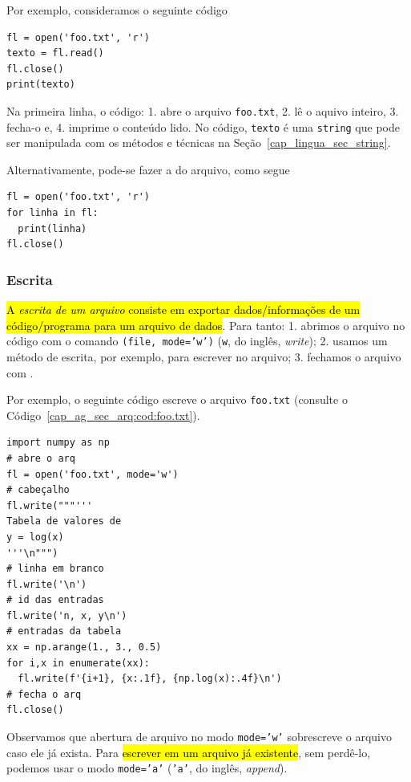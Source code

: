 Por exemplo, consideramos o seguinte código

\begin{lstlisting}
fl = open('foo.txt', 'r')
texto = fl.read()
fl.close()
print(texto)
\end{lstlisting}

Na primeira linha, o código: 1. abre o arquivo \texttt{foo.txt}, 2. lê o aquivo inteiro, 3. fecha-o e, 4. imprime o conteúdo lido. No código, \texttt{texto} é uma \texttt{string} que pode ser manipulada com os métodos e técnicas na Seção~\ref{cap_lingua_sec_string}.

Alternativamente, pode-se fazer a  do arquivo, como segue

\begin{lstlisting}
fl = open('foo.txt', 'r')
for linha in fl:
  print(linha)
fl.close()
\end{lstlisting}

\subsubsection{Escrita}

\hl{A \emph{escrita de um arquivo} consiste em exportar dados/informações de um código/programa para um arquivo de dados}. Para tanto: 1. abrimos o arquivo no código com o comando {\PYTHONopen}\texttt{(file, mode='w')} (\texttt{w}, do inglês, \textit{write}); 2. usamos um método de escrita, por exemplo, {\PYTHONfileDOTwrite} para escrever no arquivo; 3. fechamos o arquivo com {\PYTHONfileDOTclose}.

Por exemplo, o seguinte código escreve o arquivo \texttt{foo.txt} (consulte o Código~\ref{cap_ag_sec_arq:cod:foo.txt}).

\begin{lstlisting}[caption=foo.py, label=cap_ag_sec_arq:cod:foo.py]
import numpy as np
# abre o arq
fl = open('foo.txt', mode='w')
# cabeçalho
fl.write("""'''
Tabela de valores de
y = log(x)
'''\n""")
# linha em branco
fl.write('\n')
# id das entradas
fl.write('n, x, y\n')
# entradas da tabela
xx = np.arange(1., 3., 0.5)
for i,x in enumerate(xx):
  fl.write(f'{i+1}, {x:.1f}, {np.log(x):.4f}\n')
# fecha o arq
fl.close()
\end{lstlisting}

Observamos que abertura de arquivo no modo \texttt{mode='w'} sobrescreve o arquivo caso ele já exista. Para \hl{escrever em um arquivo já existente}, sem perdê-lo, podemos usar o modo \texttt{mode='a'} (\texttt{'a'}, do inglês, \textit{append}).

